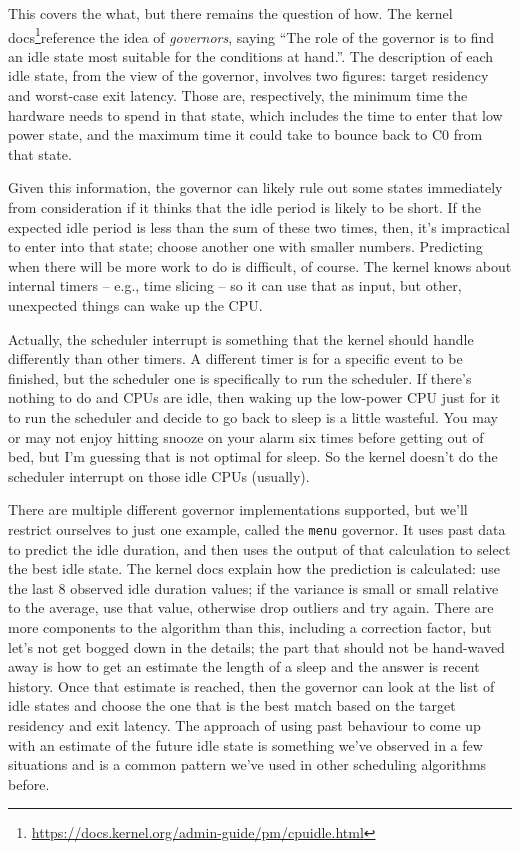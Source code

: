 This covers the what, but there remains the question of how. The kernel docs\footnote{ \url{https://docs.kernel.org/admin-guide/pm/cpuidle.html}}reference the idea of \textit{governors}, saying ``The role of the governor is to find an idle state most suitable for the conditions at hand.''. The description of each idle state, from the view of the governor, involves two figures: target residency and worst-case exit latency. Those are, respectively, the minimum time the hardware needs to spend in that state, which includes the time to enter that low power state, and the maximum time it could take to bounce back to C0 from that state. 

Given this information, the governor can likely rule out some states immediately from consideration if it thinks that the idle period is likely to be short. If the expected idle period is less than the sum of these two times, then, it's impractical to enter into that state; choose another one with smaller numbers. Predicting when there will be more work to do is difficult, of course. The kernel knows about internal timers -- e.g., time slicing -- so it can use that as input, but other, unexpected things can wake up the CPU. 

Actually, the scheduler interrupt is something that the kernel should handle differently than other timers. A different timer is for a specific event to be finished, but the scheduler one is specifically to run the scheduler. If there's nothing to do and CPUs are idle, then waking up the low-power CPU just for it to run the scheduler and decide to go back to sleep is a little wasteful. You may or may not enjoy hitting snooze on your alarm six times before getting out of bed, but I'm guessing that is not optimal for sleep. So the kernel doesn't do the scheduler interrupt on those idle CPUs (usually).

There are multiple different governor implementations supported, but we'll restrict ourselves to just one example, called the \texttt{menu} governor. It uses past data to predict the idle duration, and then uses the output of that calculation to select the best idle state. The kernel docs explain how the prediction is calculated: use the last 8 observed idle duration values; if the variance is small or small relative to the average, use that value, otherwise drop outliers and try again. There are more components to the algorithm than this, including a correction factor, but let's not get bogged down in the details; the part that should not be hand-waved away is how to get an estimate the length of a sleep and the answer is recent history. Once that estimate is reached, then the governor can look at the list of idle states and choose the one that is the best match based on the target residency and exit latency. The approach of using past behaviour to come up with an estimate of the future idle state is something we've observed in a few situations and is a common pattern we've used in other scheduling algorithms before.

